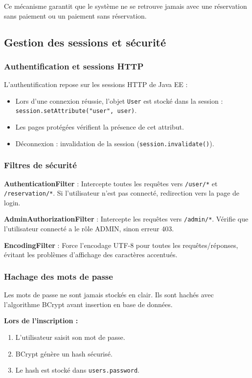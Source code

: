 \documentclass[12pt,a4paper]{report}
\begin{document}
Ce mécanisme garantit que le système ne se retrouve jamais avec une réservation sans paiement ou un paiement sans réservation.

\subsection{Gestion des sessions et sécurité}

\subsubsection{Authentification et sessions HTTP}

L'authentification repose sur les sessions HTTP de Java EE :

\begin{itemize}
    \item Lors d'une connexion réussie, l'objet \texttt{User} est stocké dans la session : \texttt{session.setAttribute("user", user)}.
    \item Les pages protégées vérifient la présence de cet attribut.
    \item Déconnexion : invalidation de la session (\texttt{session.invalidate()}).
\end{itemize}

\subsubsection{Filtres de sécurité}

\textbf{AuthenticationFilter} : Intercepte toutes les requêtes vers \texttt{/user/*} et \texttt{/reservation/*}. Si l'utilisateur n'est pas connecté, redirection vers la page de login.

\textbf{AdminAuthorizationFilter} : Intercepte les requêtes vers \texttt{/admin/*}. Vérifie que l'utilisateur connecté a le rôle ADMIN, sinon erreur 403.

\textbf{EncodingFilter} : Force l'encodage UTF-8 pour toutes les requêtes/réponses, évitant les problèmes d'affichage des caractères accentués.

\subsubsection{Hachage des mots de passe}

Les mots de passe ne sont jamais stockés en clair. Ils sont hachés avec l'algorithme BCrypt avant insertion en base de données.

\textbf{Lors de l'inscription :}
\begin{enumerate}
    \item L'utilisateur saisit son mot de passe.
    \item BCrypt génère un hash sécurisé.
    \item Le hash est stocké dans \texttt{users.password}.
\end{enumerate}
\end{document}
